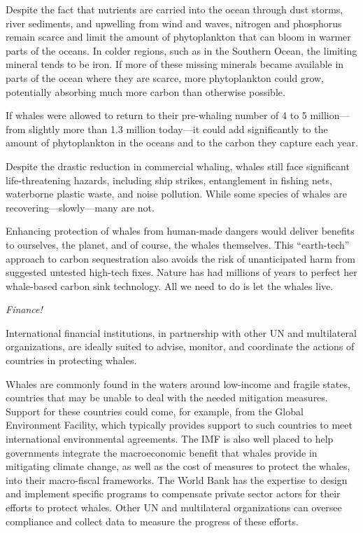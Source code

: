 \documentclass[
]{book}
\begin{document}
Despite the fact that nutrients are carried into the ocean through dust storms, river sediments, and upwelling from wind and waves, nitrogen and phosphorus remain scarce and limit the amount of phytoplankton that can bloom in warmer parts of the oceans. In colder regions, such as in the Southern Ocean, the limiting mineral tends to be iron. If more of these missing minerals became available in parts of the ocean where they are scarce, more phytoplankton could grow, potentially absorbing much more carbon than otherwise possible.

If whales were allowed to return to their pre-whaling number of 4 to 5 million---from slightly more than 1.3 million today---it could add significantly to the amount of phytoplankton in the oceans and to the carbon they capture each year.

Despite the drastic reduction in commercial whaling, whales still face significant life-threatening hazards, including ship strikes, entanglement in fishing nets, waterborne plastic waste, and noise pollution. While some species of whales are recovering---slowly---many are not.

Enhancing protection of whales from human-made dangers would deliver benefits to ourselves, the planet, and of course, the whales themselves. This ``earth-tech'' approach to carbon sequestration also avoids the risk of unanticipated harm from suggested untested high-tech fixes. Nature has had millions of years to perfect her whale-based carbon sink technology. All we need to do is let the whales live.

\emph{Finance!}

International financial institutions, in partnership with other UN and multilateral organizations, are ideally suited to advise, monitor, and coordinate the actions of countries in protecting whales.

Whales are commonly found in the waters around low-income and fragile states, countries that may be unable to deal with the needed mitigation measures. Support for these countries could come, for example, from the Global Environment Facility, which typically provides support to such countries to meet international environmental agreements. The IMF is also well placed to help governments integrate the macroeconomic benefit that whales provide in mitigating climate change, as well as the cost of measures to protect the whales, into their macro-fiscal frameworks. The World Bank has the expertise to design and implement specific programs to compensate private sector actors for their efforts to protect whales. Other UN and multilateral organizations can oversee compliance and collect data to measure the progress of these efforts.
\end{document}
